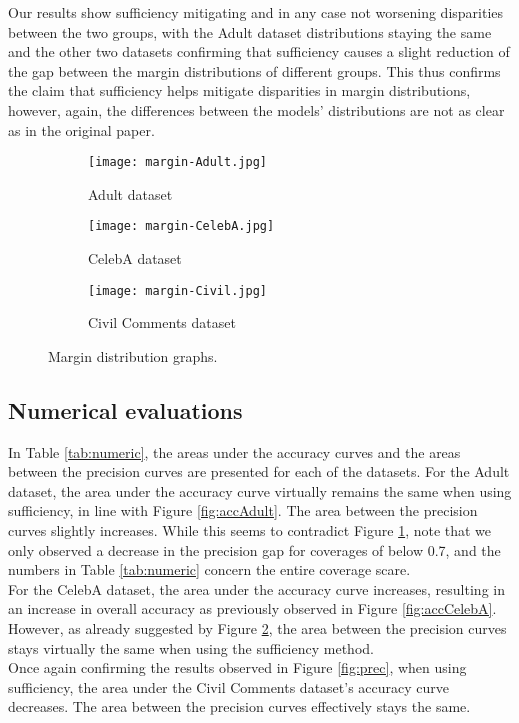 Our results show sufficiency mitigating and in any case not worsening disparities between the two groups, with the Adult dataset distributions staying the same and the other two datasets confirming that sufficiency causes a slight reduction of the gap between the margin distributions of different groups. This thus confirms the claim that sufficiency helps mitigate disparities in margin distributions, however, again, the differences between the models' distributions are not as clear as in the original paper.

\begin{figure}[!h]
     \centering
     \begin{subfigure}[b]{0.3\textwidth}
         \centering
         \texttt{[image: margin-Adult.jpg]}
         \caption{Adult dataset}
         \label{fig:marginAdult}
     \end{subfigure}
     \hfill
     \begin{subfigure}[b]{0.3\textwidth}
         \centering
         \texttt{[image: margin-CelebA.jpg]}
         \caption{CelebA dataset}
         \label{fig:marginCelebA}
     \end{subfigure}
     \hfill
     \begin{subfigure}[b]{0.3\textwidth}
         \centering
         \texttt{[image: margin-Civil.jpg]}
         \caption{Civil Comments dataset}
         \label{fig:marginCivil}
     \end{subfigure}
        \caption{Margin distribution graphs.}
        \label{fig:three graphs}
\end{figure}

\subsection{Numerical evaluations}
In Table \ref{tab:numeric}, the areas under the accuracy curves and the areas between the precision curves are presented for each of the datasets. 
For the Adult dataset, the area under the accuracy curve virtually remains the same when using sufficiency, in line with Figure \ref{fig:accAdult}. The area between the precision curves slightly increases. While this seems to contradict Figure \ref{fig:marginAdult}, note that we only observed a decrease in the precision gap for coverages of below 0.7, and the numbers in Table \ref{tab:numeric} concern the entire coverage scare.\\
For the CelebA dataset, the area under the accuracy curve increases, resulting in an increase in overall accuracy as previously observed in Figure \ref{fig:accCelebA}. However, as already suggested by Figure \ref{fig:marginCelebA}, the area between the precision curves stays virtually the same when using the sufficiency method.\\
Once again confirming the results observed in Figure \ref{fig:prec}, when using sufficiency, the area under the Civil Comments dataset's accuracy curve decreases. The area between the precision curves effectively stays the same.

